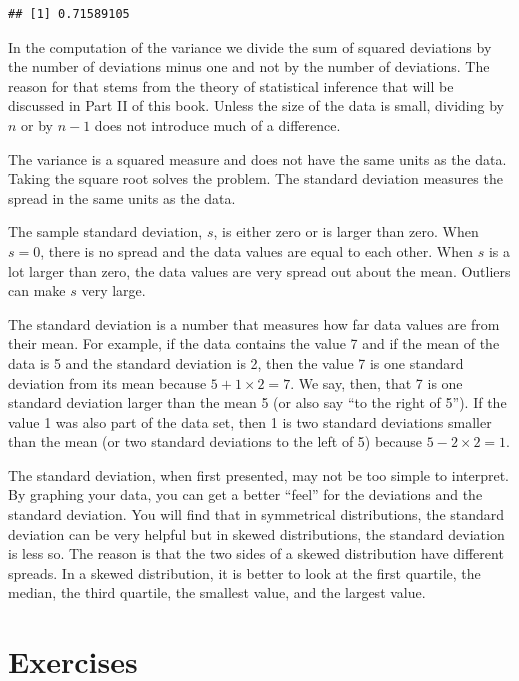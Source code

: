 \documentclass[]{krantz}
\theoremstyle{definition}
\theoremstyle{definition}
\theoremstyle{definition}
\theoremstyle{remark}
\begin{document}
\begin{verbatim}
## [1] 0.71589105
\end{verbatim}

In the computation of the variance we divide the sum of squared
deviations by the number of deviations minus one and not by the number
of deviations. The reason for that stems from the theory of statistical
inference that will be discussed in Part II of this book. Unless the
size of the data is small, dividing by \(n\) or by \(n-1\) does not
introduce much of a difference.

The variance is a squared measure and does not have the same units as
the data. Taking the square root solves the problem. The standard
deviation measures the spread in the same units as the data.

The sample standard deviation, \(s\), is either zero or is larger than
zero. When \(s=0\), there is no spread and the data values are equal to
each other. When \(s\) is a lot larger than zero, the data values are
very spread out about the mean. Outliers can make \(s\) very large.

The standard deviation is a number that measures how far data values are
from their mean. For example, if the data contains the value 7 and if
the mean of the data is 5 and the standard deviation is 2, then the
value 7 is one standard deviation from its mean because
\(5 + 1 \times 2 = 7\). We say, then, that 7 is one standard deviation
larger than the mean 5 (or also say ``to the right of 5''). If the value
1 was also part of the data set, then 1 is two standard deviations
smaller than the mean (or two standard deviations to the left of 5)
because \(5 - 2 \times 2 = 1\).

The standard deviation, when first presented, may not be too simple to
interpret. By graphing your data, you can get a better ``feel'' for the
deviations and the standard deviation. You will find that in symmetrical
distributions, the standard deviation can be very helpful but in skewed
distributions, the standard deviation is less so. The reason is that the
two sides of a skewed distribution have different spreads. In a skewed
distribution, it is better to look at the first quartile, the median,
the third quartile, the smallest value, and the largest value.

\section{Exercises}\label{exercises-2}
\end{document}
